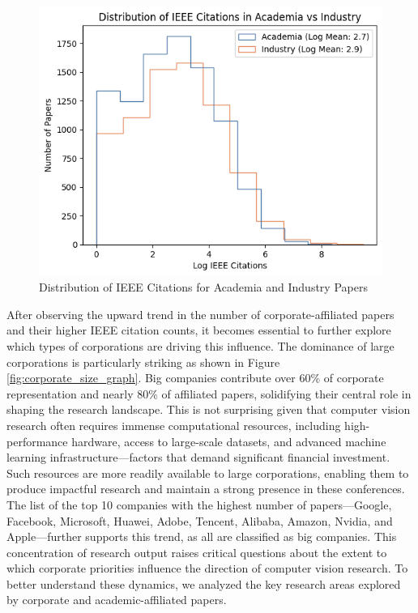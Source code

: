 \documentclass{article}
\begin{document}
\begin{figure}
    \centering
    \includegraphics[width=0.6\linewidth]{report/images/histogram_ieee_citations.png}
    \caption{Distribution of IEEE Citations for Academia and Industry Papers}
    \label{fig:ieee_citations}
\end{figure}

After observing the upward trend in the number of corporate-affiliated papers and their higher IEEE citation counts, it becomes essential to further explore which types of corporations are driving this influence. The dominance of large corporations is particularly striking as shown in Figure \ref{fig:corporate_size_graph}. Big companies contribute over 60\% of corporate representation and nearly 80\% of affiliated papers, solidifying their central role in shaping the research landscape. This is not surprising given that computer vision research often requires immense computational resources, including high-performance hardware, access to large-scale datasets, and advanced machine learning infrastructure—factors that demand significant financial investment. Such resources are more readily available to large corporations, enabling them to produce impactful research and maintain a strong presence in these conferences. The list of the top 10 companies with the highest number of papers—Google, Facebook, Microsoft, Huawei, Adobe, Tencent, Alibaba, Amazon, Nvidia, and Apple—further supports this trend, as all are classified as big companies. This concentration of research output raises critical questions about the extent to which corporate priorities influence the direction of computer vision research. To better understand these dynamics, we analyzed the key research areas explored by corporate and academic-affiliated papers. 
\end{document}
